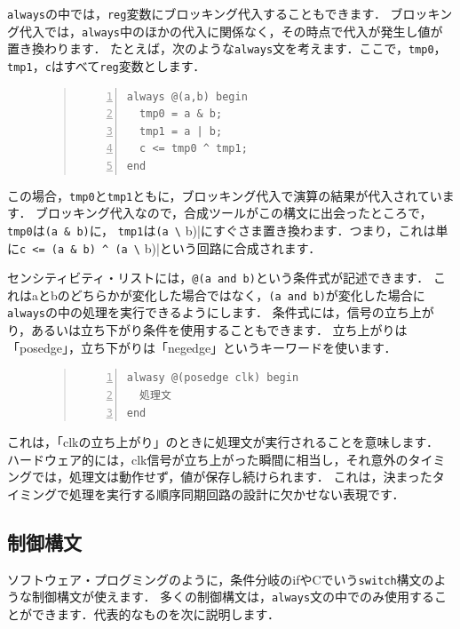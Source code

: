 \documentclass[a4paper,dvipdfmx]{jsarticle}
\begin{document}
\verb|always|の中では，\verb|reg|変数にブロッキング代入することもできます．
ブロッキング代入では，\verb|always|中のほかの代入に関係なく，その時点で代入が発生し値が置き換わります．
たとえば，次のような\verb|always|文を考えます．ここで，\verb|tmp0|，\verb|tmp1|，\verb|c|はすべて\verb|reg|変数とします．
\begin{figure}[H]
\begin{quote}
\begin{Verbatim}[frame=single, numbers=left, baselinestretch=0.8]
always @(a,b) begin
  tmp0 = a & b;
  tmp1 = a | b;
  c <= tmp0 ^ tmp1;
end
\end{Verbatim}
\end{quote}
\end{figure}
この場合，\verb|tmp0|と\verb|tmp1|ともに，ブロッキング代入で演算の結果が代入されています．
ブロッキング代入なので，合成ツールがこの構文に出会ったところで，\verb|tmp0|は\verb|(a & b)|に，
\verb|tmp1|は\verb|(a \| b)|にすぐさま置き換わます．つまり，これは単に\verb|c <= (a & b) ^ (a \| b)|という回路に合成されます．

センシティビティ・リストには，\verb|@(a and b)|という条件式が記述できます．
これはaとbのどちらかが変化した場合ではなく，\verb|(a and b)|が変化した場合に\verb|always|の中の処理を実行できるようにします．
条件式には，信号の立ち上がり，あるいは立ち下がり条件を使用することもできます．
立ち上がりは「posedge」，立ち下がりは「negedge」というキーワードを使います．
\begin{figure}[H]
\begin{quote}
\begin{Verbatim}[frame=single, numbers=left, baselinestretch=0.8]
alwasy @(posedge clk) begin
  処理文
end
\end{Verbatim}
\end{quote}
\end{figure}
これは，「clkの立ち上がり」のときに処理文が実行されることを意味します．
ハードウェア的には，clk信号が立ち上がった瞬間に相当し，それ意外のタイミングでは，処理文は動作せず，値が保存し続けられます．
これは，決まったタイミングで処理を実行する順序同期回路の設計に欠かせない表現です．

\subsection{制御構文}
ソフトウェア・プログミングのように，条件分岐のifやCでいう\verb|switch|構文のような制御構文が使えます．
多くの制御構文は，\verb|always|文の中でのみ使用することができます．代表的なものを次に説明します．
\end{document}
